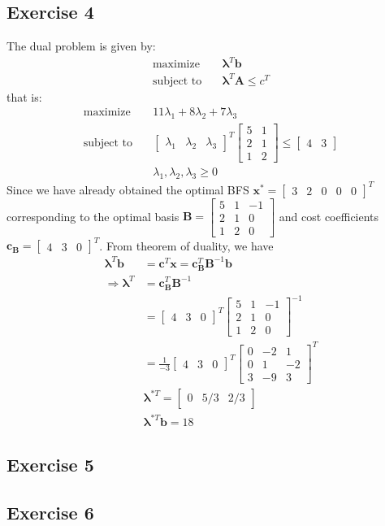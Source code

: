 \documentclass[11pt]{article}
\newcommand{\V}[1]{\pmb{#1}}
\newcommand{\mat}[1]{\begin{bmatrix}#1\end{bmatrix}}
\begin{document}
\subsection*{Exercise 4} 
The dual problem is given by:
\begin{align*}
 \text{maximize} \quad& \V{\lambda}^T\V{b}\\
 \text{subject to} \quad& \V{\lambda}^T\V{A} \leq c^T
\end{align*}
\noindent that is:
\begin{align*}
 \text{maximize} \quad& 11\lambda_1 +8\lambda_2 + 7\lambda_3\\
 \text{subject to} \quad& \mat{\lambda_1 &\lambda_2& \lambda_3}^T
 \mat{5& 1\\
 2& 1\\
 1& 2} 
 \leq \mat{4& 3}\\
 & \lambda_1,\lambda_2,\lambda_3 \geq 0
\end{align*}
Since we have already obtained the optimal BFS $\V{x}^* = \mat{3& 2& 0& 0& 0}^T$ corresponding to the optimal basis 
$\V{B} = \mat{5& 1& -1\\ 2& 1& 0\\ 1& 2& 0}$ and cost coefficients $\V{c}_{\V{B}} = \mat{4& 3& 0}^T$. From theorem of duality, we have
\begin{align*}
 \V{\lambda}^T\V{b} &= \V{c}^T\V{x} = \V{c}_{\V{B}}^T\V{B}^{-1}\V{b}\\
 \Rightarrow \V{\lambda}^T &= \V{c}_{\V{B}}^T\V{B}^{-1}\\
 &= \mat{4& 3& 0}^T \mat{5& 1& -1\\ 2& 1& 0\\ 1& 2& 0}^{-1}\\
 &= \frac{1}{-3}\mat{4& 3& 0}^T\mat{0& -2& 1\\0& 1& -2\\ 3& -9& 3}^T\\
 &\V{\lambda}^{* T}= \mat{0& 5/3& 2/3}\\
 &\V{\lambda}^{* T}\V{b} = 18
\end{align*}
% 
% 
\clearpage
\vspace{2ex}
\subsection*{Exercise 5} 


\clearpage
\vspace{2ex}
\subsection*{Exercise 6} 
\end{document}
